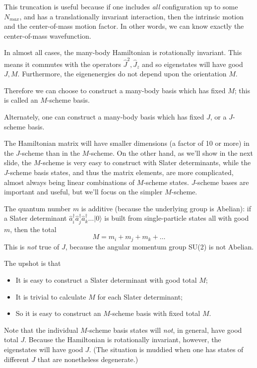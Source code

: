 \documentclass[%
twoside,                 %
final,                   %
10pt]{article}
\begin{document}
This truncation is useful because if one includes \emph{all} configuration up to 
some $N_{max}$, and has a translationally invariant interaction, then the intrinsic 
motion and the center-of-mass motion factor. In other words, we can know exactly 
the center-of-mass wavefunction. 

In almost all cases, the many-body Hamiltonian is rotationally invariant. This means 
it commutes with the operators $\hat{J}^2, \hat{J}_z$ and so eigenstates will have 
good $J,M$. Furthermore, the eigenenergies do not depend upon the orientation $M$. 


Therefore we can choose to construct a many-body basis which has fixed $M$; this is 
called an $M$-scheme basis. 


Alternately, one can construct a many-body basis which has fixed $J$, or a $J$-scheme 
basis. 

The Hamiltonian matrix will have smaller dimensions (a factor of 10 or more) in the $J$-scheme than in the $M$-scheme. 
On the other hand, as we'll show in the next slide, the $M$-scheme is very easy to 
construct with Slater determinants, while the $J$-scheme basis states, and thus the 
matrix elements, are more complicated, almost always being linear combinations of 
$M$-scheme states. $J$-scheme bases are important and useful, but we'll focus on the 
simpler $M$-scheme.

The quantum number $m$ is additive (because the underlying group is Abelian): 
if a Slater determinant $\hat{a}_i^\dagger \hat{a}^\dagger_j \hat{a}^\dagger_k \ldots | 0 \rangle$ 
is built from single-particle states all with good $m$, then the total 
\[
M = m_i + m_j + m_k + \ldots
\]
This is \emph{not} true of $J$, because the angular momentum group SU(2) is not Abelian.

The upshot is that 
\begin{itemize}
\item It is easy to construct a Slater determinant with good total $M$;

\item It is trivial to calculate $M$ for each Slater determinant;

\item So it is easy to construct an $M$-scheme basis with fixed total $M$.
\end{itemize}

\noindent
Note that the individual $M$-scheme basis states will \emph{not}, in general, 
have good total $J$. 
Because the Hamiltonian is rotationally invariant, however, the eigenstates will 
have good $J$. (The situation is muddied when one has states of different $J$ that are 
nonetheless degenerate.) 
\end{document}

